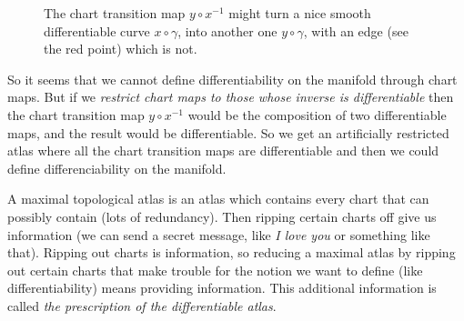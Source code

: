 \begin{figure}[ht]
  \caption{The chart transition map $y\circ x^{-1}$ might turn a nice smooth differentiable curve
    $x\circ\gamma$, into another one $y\circ\gamma$, with an edge (see the red point) which is
    not.}
  \label{fig:mf-curve-failed-differentiation}
\end{figure}

So it seems that we cannot define differentiability on the manifold through chart maps. But if we
\emph{restrict chart maps to those whose inverse is differentiable}\footnotemark{} then the chart
transition map $y\circ x^{-1}$ would be the composition of two differentiable maps, and the result
would be differentiable.
So we get an artificially restricted atlas where all the chart transition maps are differentiable
and then we could define differenciability on the manifold.

A maximal topological atlas is an atlas which contains every chart that can possibly contain
(lots of redundancy). Then ripping certain charts off give us information (we can send a
secret message, like \emph{I love you} or something like that).
Ripping out charts is information, so reducing a maximal atlas by ripping out certain charts that
make trouble for the notion we want to define (like differentiability) means providing information.
This additional information is called \emph{the prescription of the differentiable atlas}.

